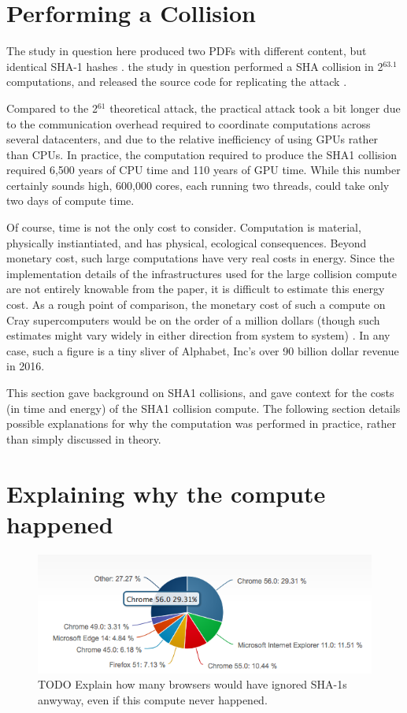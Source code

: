 \documentclass[sigconf]{acmart}
\begin{document}
\section{Performing a Collision}
\label{sec:orgb8deeb2}

The study in question here produced two PDFs with different content, but identical SHA-1 hashes
\cite{Stevens2017}.
the study in question performed a SHA collision in 2\(^{\text{63.1}}\) computations, 
and released the source code for replicating the attack
\cite{Stevens2017github}.

Compared to the 2\(^{\text{61}}\) theoretical attack, the practical attack took a bit longer due to the communication overhead required to coordinate computations across several datacenters, and due to the relative inefficiency of using GPUs rather than CPUs.
In practice, the computation required to produce the SHA1 collision required 6,500 years of CPU time and 110 years of GPU time. While this number certainly sounds high, 600,000 cores, each running two threads, could take only two days of compute time.

Of course, time is not the only cost to consider.
Computation is material, physically instiantiated, and has physical, ecological consequences.
Beyond monetary cost, such large computations have very real costs in energy.
Since the implementation details of the infrastructures used for the large collision compute are not entirely knowable from the paper,
it is difficult to estimate this energy cost.
As a rough point of comparison, the monetary cost of such a compute on Cray supercomputers would be on the order of a million dollars
(though such estimates might vary widely in either direction from system to system)
\cite{Pautsch2016}.
In any case, such a figure is a tiny sliver of Alphabet, Inc's over 90 billion dollar revenue in 2016.

This section gave background on SHA1 collisions, 
and gave context for the costs (in time and energy) of the SHA1 collision compute.
The following section details possible explanations for why the computation was performed
in practice, rather than simply discussed in theory.


\section{Explaining why the compute happened}
\label{sec:org911d416}

\begin{figure}
\centering
\includegraphics[width=.9\linewidth]{./figures/browser-share.png}
\caption{TODO Explain how many browsers would have ignored SHA-1s anwyway, even if this compute never happened.}
\end{figure}
\end{document}

